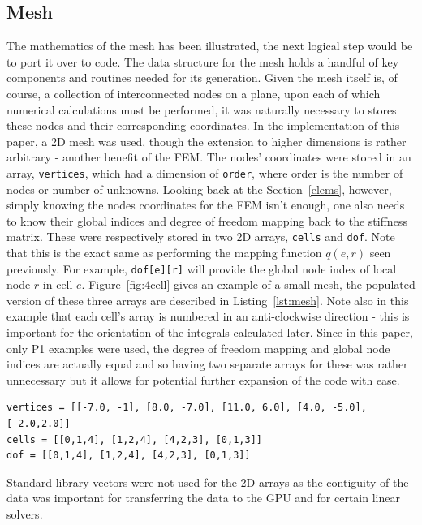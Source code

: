 \subsection{Mesh}\label{mesh}

The mathematics of the mesh has been illustrated, the next logical step would be to port it over to code. The data structure for the mesh holds a handful of key components and routines needed for its generation. Given the mesh itself is, of course, a collection of interconnected nodes on a plane, upon each of which numerical calculations must be performed, it was naturally necessary to stores these nodes and their corresponding coordinates. In the implementation of this paper, a 2D mesh was used, though the extension to higher dimensions is rather arbitrary - another benefit of the FEM. The nodes' coordinates were stored in an array, \texttt{vertices}, which had a dimension of \texttt{order}, where order is the number of nodes or number of unknowns. Looking back at the Section~\ref{elems}, however, simply knowing the nodes coordinates for the FEM isn't enough, one also needs to know their global indices and degree of freedom mapping back to the stiffness matrix. These were respectively stored in two 2D arrays, \texttt{cells} and \texttt{dof}. Note that this is the exact same as performing the mapping function $q(e,r)$ seen previously. For example, \texttt{dof[e][r]} will provide the global node index of local node $r$ in cell $e$. Figure~\ref{fig:4cell} gives an example of a small mesh, the populated version of these three arrays are described in Listing~\ref{lst:mesh}. Note also in this example that each cell's array is numbered in an anti-clockwise direction - this is important for the orientation of the integrals calculated later. Since in this paper, only P1 examples were used, the degree of freedom mapping and global node indices are actually equal and so having two separate arrays for these was rather unnecessary but it allows for potential further expansion of the code with ease.

\begin{lstlisting}[basicstyle=\footnotesize, caption={Example of populated mesh.}, label={lst:mesh}]
vertices = [[-7.0, -1], [8.0, -7.0], [11.0, 6.0], [4.0, -5.0], [-2.0,2.0]]
cells = [[0,1,4], [1,2,4], [4,2,3], [0,1,3]]
dof = [[0,1,4], [1,2,4], [4,2,3], [0,1,3]]
\end{lstlisting}

\begin{remark}
	Standard library vectors were not used for the 2D arrays as the contiguity of the data was important for transferring the data to the GPU and for certain linear solvers.
\end{remark}

